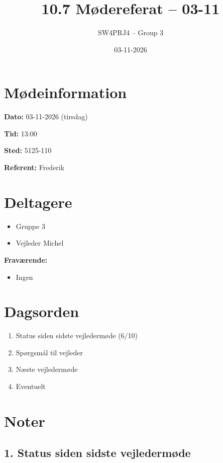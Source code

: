 \documentclass[a4paper,11pt]{article}
\title{10.7 Mødereferat -- 03-11}
\author{SW4PRJ4 -- Group 3}
\date{03-11-2026}
\begin{document}
\maketitle

\section*{Mødeinformation}

\textbf{Dato:} 03-11-2026 (tirsdag)

\textbf{Tid:} 13:00

\textbf{Sted:} 5125-110

\textbf{Referent:} Frederik

\section*{Deltagere}

\begin{itemize}
    \item Gruppe 3
    \item Vejleder Michel
\end{itemize}

\textbf{Fraværende:}

\begin{itemize}
    \item Ingen
\end{itemize}

\section*{Dagsorden}

\begin{enumerate}
    \item Status siden sidste vejledermøde (6/10)
    \item Spørgsmål til vejleder
    \item Næste vejledermøde
    \item Eventuelt
\end{enumerate}

\section*{Noter}

\subsection*{1. Status siden sidste vejledermøde}
\end{document}
